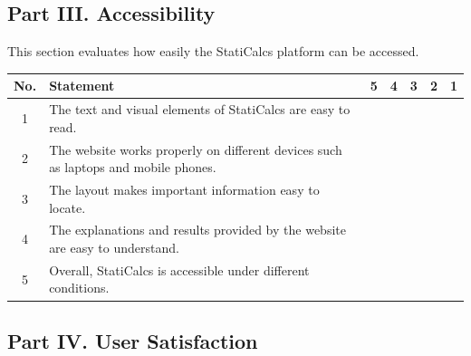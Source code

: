 \subsection*{Part III. Accessibility}

This section evaluates how easily the StatiCalcs platform can be accessed.  

\vspace{0.3cm}

\begin{tabular}{c p{7cm} c c c c c}
\hline
\textbf{No.} & \textbf{Statement} & \textbf{5} & \textbf{4} & \textbf{3} & \textbf{2} & \textbf{1} \\
\hline
1 & The text and visual elements of StatiCalcs are easy to read. & \fbox{\rule{0pt}{0.2cm}\rule{0.2cm}{0pt}} & \fbox{\rule{0pt}{0.2cm}\rule{0.2cm}{0pt}} & \fbox{\rule{0pt}{0.2cm}\rule{0.2cm}{0pt}} & \fbox{\rule{0pt}{0.2cm}\rule{0.2cm}{0pt}} & \fbox{\rule{0pt}{0.2cm}\rule{0.2cm}{0pt}} \\
2 & The website works properly on different devices such as laptops and mobile phones. & \fbox{\rule{0pt}{0.2cm}\rule{0.2cm}{0pt}} & \fbox{\rule{0pt}{0.2cm}\rule{0.2cm}{0pt}} & \fbox{\rule{0pt}{0.2cm}\rule{0.2cm}{0pt}} & \fbox{\rule{0pt}{0.2cm}\rule{0.2cm}{0pt}} & \fbox{\rule{0pt}{0.2cm}\rule{0.2cm}{0pt}} \\
3 & The layout makes important information easy to locate. & \fbox{\rule{0pt}{0.2cm}\rule{0.2cm}{0pt}} & \fbox{\rule{0pt}{0.2cm}\rule{0.2cm}{0pt}} & \fbox{\rule{0pt}{0.2cm}\rule{0.2cm}{0pt}} & \fbox{\rule{0pt}{0.2cm}\rule{0.2cm}{0pt}} & \fbox{\rule{0pt}{0.2cm}\rule{0.2cm}{0pt}} \\
4 & The explanations and results provided by the website are easy to understand. & \fbox{\rule{0pt}{0.2cm}\rule{0.2cm}{0pt}} & \fbox{\rule{0pt}{0.2cm}\rule{0.2cm}{0pt}} & \fbox{\rule{0pt}{0.2cm}\rule{0.2cm}{0pt}} & \fbox{\rule{0pt}{0.2cm}\rule{0.2cm}{0pt}} & \fbox{\rule{0pt}{0.2cm}\rule{0.2cm}{0pt}} \\
5 & Overall, StatiCalcs is accessible under different conditions. & \fbox{\rule{0pt}{0.2cm}\rule{0.2cm}{0pt}} & \fbox{\rule{0pt}{0.2cm}\rule{0.2cm}{0pt}} & \fbox{\rule{0pt}{0.2cm}\rule{0.2cm}{0pt}} & \fbox{\rule{0pt}{0.2cm}\rule{0.2cm}{0pt}} & \fbox{\rule{0pt}{0.2cm}\rule{0.2cm}{0pt}} \\
\hline
\end{tabular}

\vspace{5cm}
\subsection*{Part IV. User Satisfaction}

